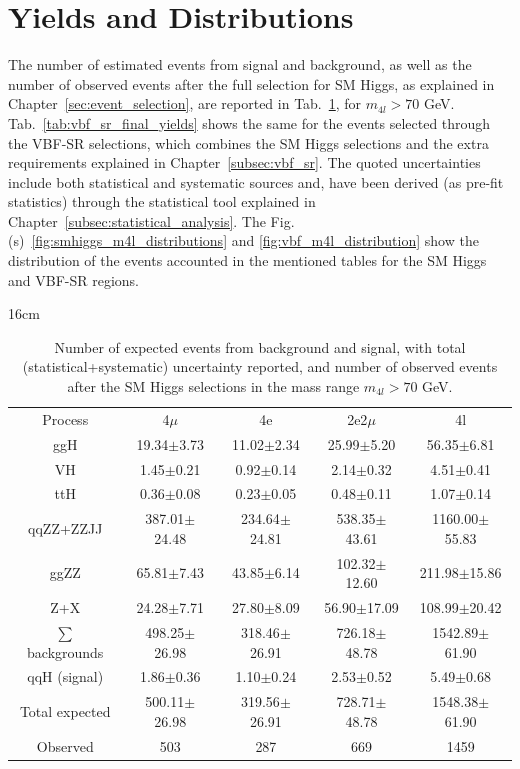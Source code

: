 \section{Yields and Distributions}
The number of estimated events from signal and background, as well as the number of observed events after the full selection for SM Higgs, as explained in Chapter~\ref{sec:event_selection}, are reported in Tab.~\ref{tab:sm_higgs_final_yields}, for $m_{4l} > 70$ GeV. Tab.~\ref{tab:vbf_sr_final_yields} shows the same for the events selected through the VBF-SR selections, which combines the SM Higgs selections and the extra requirements explained in Chapter~\ref{subsec:vbf_sr}. The quoted uncertainties include both statistical and systematic sources and, have been derived (as pre-fit statistics) through the statistical tool explained in Chapter~\ref{subsec:statistical_analysis}. The Fig.(s)~\ref{fig:smhiggs_m4l_distributions} and \ref{fig:vbf_m4l_distribution} show the distribution of the events accounted in the mentioned tables for the SM Higgs and VBF-SR regions.

\begin{table}[hbtp]{16cm}
	\caption{Number of expected events from background and signal, with total (statistical+systematic) uncertainty reported, and number of observed events after the SM Higgs selections in the mass range $m_{4l} > 70$ GeV.}
	\centering
	\begin{tabular}{c|c|c|c|c}
		\hline
		\rowcolor{light_gray}
		Process                     & 4$\mu$           & 4e               & 2e2$\mu$         & 4l\\
		ggH                         &  19.34$\pm$3.73  &  11.02$\pm$2.34  &  25.99$\pm$5.20  &   56.35$\pm$6.81\\
		VH                          &   1.45$\pm$0.21  &   0.92$\pm$0.14  &   2.14$\pm$0.32  &    4.51$\pm$0.41\\
		ttH                         &   0.36$\pm$0.08  &   0.23$\pm$0.05  &   0.48$\pm$0.11  &    1.07$\pm$0.14\\
		qqZZ+ZZJJ                   & 387.01$\pm$24.48 & 234.64$\pm$24.81 & 538.35$\pm$43.61 & 1160.00$\pm$55.83\\
		ggZZ                        &  65.81$\pm$7.43  &  43.85$\pm$6.14  & 102.32$\pm$12.60 &  211.98$\pm$15.86\\
		Z+X                         &  24.28$\pm$7.71  &  27.80$\pm$8.09  &  56.90$\pm$17.09 &  108.99$\pm$20.42\\
		\hline
		$\sum$ backgrounds          & 498.25$\pm$26.98 & 318.46$\pm$26.91 & 726.18$\pm$48.78 & 1542.89$\pm$61.90\\
		\hline
		qqH (signal)                &   1.86$\pm$0.36  &   1.10$\pm$0.24  &   2.53$\pm$0.52  &    5.49$\pm$0.68\\
		\hline
		Total expected              & 500.11$\pm$26.98 & 319.56$\pm$26.91 & 728.71$\pm$48.78 & 1548.38$\pm$61.90\\
		\hline
		Observed                    & 503              & 287              & 669              & 1459\\
		\hline
	\end{tabular}
	\label{tab:sm_higgs_final_yields}
\end{table}


